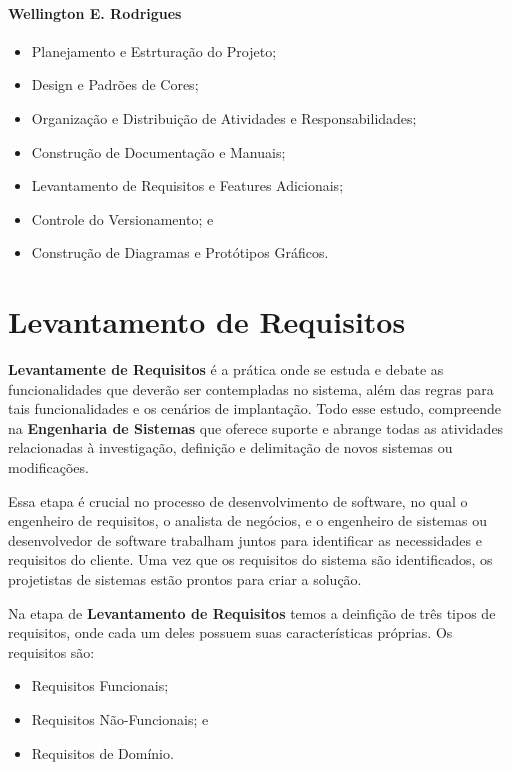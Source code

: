 \documentclass[a4paper,12pt]{article}
\begin{document}
\paragraph{Wellington E. Rodrigues}
\begin{itemize}
	\item Planejamento e Estrturação do Projeto;
    	\item Design e Padrões de Cores;
    	\item Organização e Distribuição de Atividades e Responsabilidades;
    	\item Construção de Documentação e Manuais;
   	\item Levantamento de Requisitos e Features Adicionais;
    	\item Controle do Versionamento; e
    	\item Construção de Diagramas e Protótipos Gráficos.

\end{itemize}

\section{Levantamento de Requisitos}
\textbf{Levantamente de Requisitos} é a prática onde se estuda e debate as funcionalidades que deverão ser contempladas no sistema, 
além das regras para tais funcionalidades e os cenários de implantação. Todo esse estudo, compreende na \textbf{Engenharia de Sistemas} 
que oferece suporte e abrange todas as atividades relacionadas à investigação, definição e delimitação de novos sistemas ou modificações.

Essa etapa é crucial no processo de desenvolvimento de software, no qual o engenheiro de requisitos, o analista de negócios, e 
o engenheiro de sistemas ou desenvolvedor de software trabalham juntos para identificar as necessidades e requisitos do cliente. Uma 
vez que os requisitos do sistema são identificados, os projetistas de sistemas estão prontos para criar a solução.

Na etapa de \textbf{Levantamento de Requisitos} temos a deinfição de três tipos de requisitos, onde cada um deles possuem suas 
características próprias. Os requisitos são:
\begin{itemize}
	\item Requisitos Funcionais;
	\item Requisitos Não-Funcionais; e
	\item Requisitos de Domínio.
\end{itemize}
\end{document}
